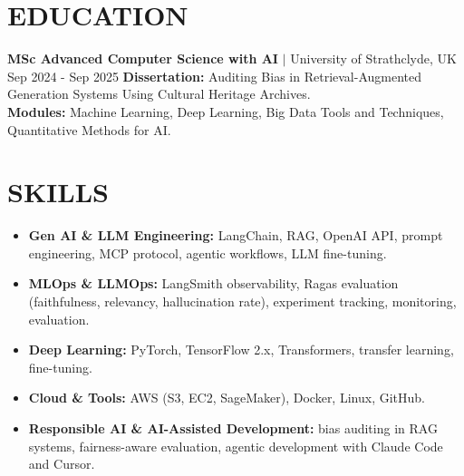 \documentclass[11pt,a4paper, sans-serif]{article}
\begin{document}
\section*{EDUCATION}

\noindent\textbf{MSc Advanced Computer Science with AI} $|$ University of Strathclyde, UK \hfill Sep 2024 - Sep 2025 
\textbf{Dissertation:} Auditing Bias in Retrieval-Augmented Generation Systems Using Cultural Heritage Archives. \\
\textbf{Modules:} Machine Learning, Deep Learning, Big Data Tools and Techniques, Quantitative Methods for AI.

\section*{SKILLS}
\begin{itemize}[leftmargin=*, nosep]
    \item \textbf{Gen AI \& LLM Engineering:} LangChain, RAG, OpenAI API, prompt engineering, MCP protocol, agentic workflows, LLM fine-tuning.
    \item \textbf{MLOps \& LLMOps:} LangSmith observability, Ragas evaluation (faithfulness, relevancy, hallucination rate), experiment tracking, monitoring, evaluation.
    \item \textbf{Deep Learning:} PyTorch, TensorFlow 2.x, Transformers, transfer learning, fine-tuning.
    \item \textbf{Cloud \& Tools:} AWS (S3, EC2, SageMaker), Docker, Linux, GitHub.
    \item \textbf{Responsible AI \& AI-Assisted Development:} bias auditing in RAG systems, fairness-aware evaluation, agentic development with Claude Code and Cursor.
\end{itemize}
\end{document}
